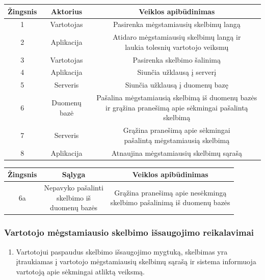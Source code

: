 \documentclass[12pt]{article}
\begin{document}
		\begin{center}
		\begin{tabular}{ | c | c | c | }
			\hline
			Žingsnis & Aktorius       & Veiklos apibūdinimas \\ \hline
			1        & Vartotojas     & Pasirenka mėgstamiausių skelbimų langą \\ \hline
			2        & Aplikacija     & \makecell{Atidaro mėgstamiausių skelbimų langą ir \\ laukia tolesnių vartotojo veiksmų} \\ \hline
			3        & Vartotojas     & Pasirenka skelbimo šalinimą \\ \hline
			4        & Aplikacija     & Siunčia užklausą į serverį \\ \hline
			5        & Serveris       & Siunčia užklausą į duomenų bazę  \\ \hline
			6        & Duomenų bazė   & \makecell{Pašalina mėgstamiausią skelbimą iš duomenų bazės \\ ir grąžina pranešimą apie sėkmingai pašalintą skelbimą} \\ \hline
			7        & Serveris       & \makecell{Grąžina pranešimą apie sėkmingai \\ pašalintą mėgstamiausią skelbimą} \\ \hline
			8        & Aplikacija     & Atnaujina mėgstamiausių skelbimų sąrašą \\ \hline
		\end{tabular}
		\bigskip

		\begin{tabular}{ | c | c | c | }
			\hline
			Žingsnis & Sąlyga                                     & Veiklos apibūdinimas \\ \hline
			6a       & \makecell{Nepavyko pašalinti \\ skelbimo iš \\ duomenų bazės} & \makecell{Grąžina pranešimą apie nesėkmingą \\ skelbimo pašalinimą iš duomenų bazės} \\ \hline
		\end{tabular}
		\end{center}	
	\pagebreak	
	
	\subsubsection{Vartotojo mėgstamiausio skelbimo išsaugojimo reikalavimai}
	\begin{enumerate}[labelindent=10pt,leftmargin=2.2cm]
		\item Vartotojui paspaudus skelbimo išsaugojimo mygtuką, skelbimas yra įtraukiamas į vartotojo mėgstamiausių skelbimų sąrašą ir sistema informuoja vartotoją apie sėkmingai atliktą veiksmą.
	\end{enumerate}
		
\end{document}
